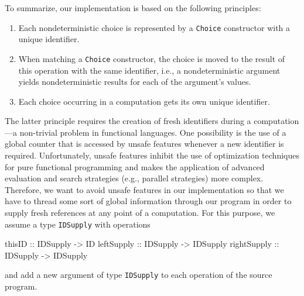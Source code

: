 \documentclass{llncs}
\newcommand{\code}[1]{\mbox{\small\texttt{#1}}}
\begin{document}
To summarize, our implementation is based on the following principles:
\begin{enumerate}
\item Each nondeterministic choice is represented by a \code{Choice}
constructor with a unique identifier.
\item When matching a \code{Choice} constructor, the choice is
moved to the result of this operation with the same identifier,
i.e., a nondeterministic argument
yields nondeterministic results for each of the argument's values.
\item Each choice occurring in a computation gets its own unique
identifier.
\end{enumerate}
The latter principle requires the creation of fresh identifiers
during a computation---a non-trivial problem in functional languages.
One possibility is the use of a global counter
that is accessed by unsafe features whenever a new identifier
is required. Unfortunately, unsafe features inhibit the use
of optimization techniques for pure functional programming
and makes the application of advanced evaluation and search
strategies (e.g., parallel strategies) more complex.
Therefore, we want to avoid unsafe features in our implementation
so that we have to thread some sort of global information
through our program in order to supply fresh references
at any point of a computation.
For this purpose, we assume a type \code{IDSupply}
with operations
\begin{haskell}
  thisID      :: IDSupply -> ID
  leftSupply  :: IDSupply -> IDSupply
  rightSupply :: IDSupply -> IDSupply
\end{haskell}
and add a new argument of type \code{IDSupply} to each operation
of the source program.
\end{document}
